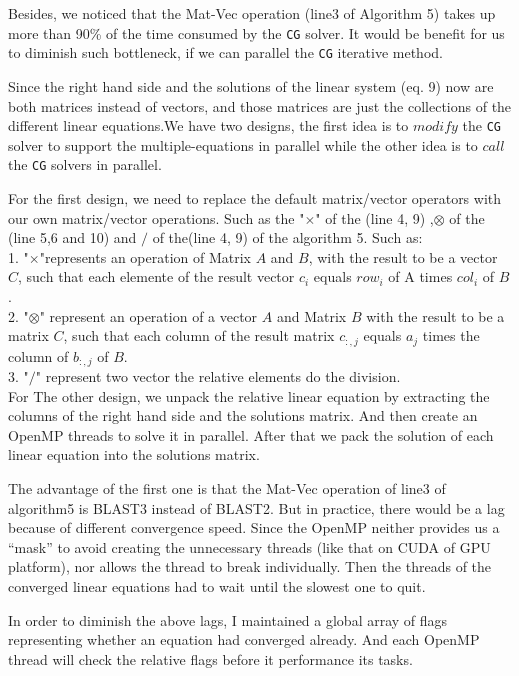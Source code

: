 Besides, we noticed that the Mat-Vec operation (line3 of Algorithm 5) takes up more than 90\% of the time consumed by the {\tt CG} solver. It would be benefit for us to diminish such bottleneck, if we can parallel the {\tt CG} iterative method.  

Since the right hand side and the solutions of the linear system (eq. 9) now are both matrices instead of vectors, and those matrices are just the collections of the different linear equations.We have two designs, the first idea is to $modify$ the {\tt CG} solver to support the multiple-equations in parallel while the other idea is to $call$ the {\tt CG} solvers in parallel.

For the first design, we need to replace the default matrix/vector operators with our own matrix/vector operations. Such as the "$\times$" of the (line 4, 9) ,$\otimes$ of the (line 5,6 and 10) and $/$ of the(line 4, 9) of the algorithm 5. Such as: \\
1. "$\times$"represents an operation of Matrix $A$ and $B$, with the result to be a vector $C$, such that each elemente of the result vector $c_i$ equals $row_i$ of A times $col_i$ of $B$. \\ 
2. "$\otimes$" represent an operation of a vector $A$ and Matrix $B$ with the result to be a matrix $C$, such that each column of the result matrix $c_{:,j}$ equals $a_j$ times the column of $b_{:,j}$ of $B$.\\
3. "$/$" represent two vector the relative elements do the  division.  \\
For The other design, we unpack the relative linear equation by extracting the columns of the right hand side and the solutions matrix. And then create an OpenMP threads to solve it in parallel. After that we pack the solution of each linear equation into the solutions matrix.

The advantage of the first one is that the Mat-Vec operation of line3 of algorithm5 is BLAST3 instead of BLAST2. But in practice, there would be a lag because of different convergence speed. Since the OpenMP neither provides us a “mask” to avoid creating the unnecessary threads (like that on CUDA of GPU platform), nor allows the thread to break individually. Then the threads of the converged linear equations had to wait until the slowest one to quit. 
 
In order to diminish the above lags, I maintained a global array of flags representing whether an equation had converged already. And each OpenMP thread will check the relative flags before it performance its tasks.  

